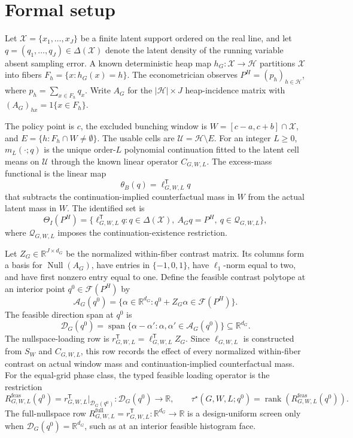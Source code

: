 \documentclass[11pt]{article}
\newcommand{\transpose}{\mathsf{T}}
\theoremstyle{definition}
\theoremstyle{plain}
\theoremstyle{remark}
\begin{document}
\section{Formal setup}
Let \(\mathcal{X}=\{x_1,\ldots,x_J\}\) be a finite latent support ordered on the real line, and let \(q=(q_1,\ldots,q_J)\in\Delta(\mathcal{X})\) denote the latent density of the running variable absent sampling error.  A known deterministic heap map \(h_G:\mathcal{X}\to\mathcal{H}\) partitions \(\mathcal{X}\) into fibers \(F_h=\{x:h_G(x)=h\}\).  The econometrician observes \(P^H=(p_h)_{h\in\mathcal{H}}\), where \(p_h=\sum_{x\in F_h}q_x\).  Write \(A_G\) for the \(|\mathcal{H}|\times J\) heap-incidence matrix with \((A_G)_{hx}=1\{x\in F_h\}\).

The policy point is \(c\), the excluded bunching window is \(W=[c-a,c+b]\cap\mathcal{X}\), and \(E=\{h:F_h\cap W\neq\emptyset\}\).  The usable cells are \(\mathcal{U}=\mathcal{H}\setminus E\).  For an integer \(L\geq0\), \(m_L(\cdot;q)\) is the unique order-\(L\) polynomial continuation fitted to the latent cell means on \(\mathcal{U}\) through the known linear operator \(C_{G,W,L}\).  The excess-mass functional is the linear map
\[
\theta_B(q)=\ell_{G,W,L}^{\transpose}q
\]
that subtracts the continuation-implied counterfactual mass in \(W\) from the actual latent mass in \(W\).  The identified set is
\[
\Theta_I(P^H)=\{\ell_{G,W,L}^{\transpose}q:q\in\Delta(\mathcal{X}),\ A_Gq=P^H,\ q\in\mathcal{Q}_{G,W,L}\},
\]
where \(\mathcal{Q}_{G,W,L}\) imposes the continuation-existence restriction.

Let \(Z_G\in\mathbb{R}^{J\times d_G}\) be the normalized within-fiber contrast matrix.  Its columns form a basis for \(\operatorname{Null}(A_G)\), have entries in \(\{-1,0,1\}\), have \(\ell_1\)-norm equal to two, and have first nonzero entry equal to one.  Define the feasible contrast polytope at an interior point \(q^0\in\mathcal{F}(P^H)\) by
\[
\mathcal{A}_G(q^0)=\{\alpha\in\mathbb{R}^{d_G}:q^0+Z_G\alpha\in\mathcal{F}(P^H)\}.
\]
The feasible direction span at \(q^0\) is
\[
\mathcal{D}_G(q^0)=\operatorname{span}\{\alpha-\alpha':\alpha,\alpha'\in\mathcal{A}_G(q^0)\}\subseteq\mathbb{R}^{d_G}.
\]
The nullspace-loading row is \(r_{G,W,L}^{\transpose}=\ell_{G,W,L}^{\transpose}Z_G\).  Since \(\ell_{G,W,L}\) is constructed from \(S_W\) and \(C_{G,W,L}\), this row records the effect of every normalized within-fiber contrast on actual window mass and continuation-implied counterfactual mass.  For the equal-grid phase class, the typed feasible loading operator is the restriction
\[
R^{\mathrm{feas}}_{G,W,L}(q^0)=r_{G,W,L}^{\transpose}\big|_{\mathcal{D}_G(q^0)}:\mathcal{D}_G(q^0)\to\mathbb{R},
\qquad
\tau^\star(G,W,L;q^0)=\operatorname{rank}(R^{\mathrm{feas}}_{G,W,L}(q^0)).
\]
The full-nullspace row \(R^{\mathrm{full}}_{G,W,L}=r_{G,W,L}^{\transpose}:\mathbb{R}^{d_G}\to\mathbb{R}\) is a design-uniform screen only when \(\mathcal{D}_G(q^0)=\mathbb{R}^{d_G}\), such as at an interior feasible histogram face.
\end{document}
